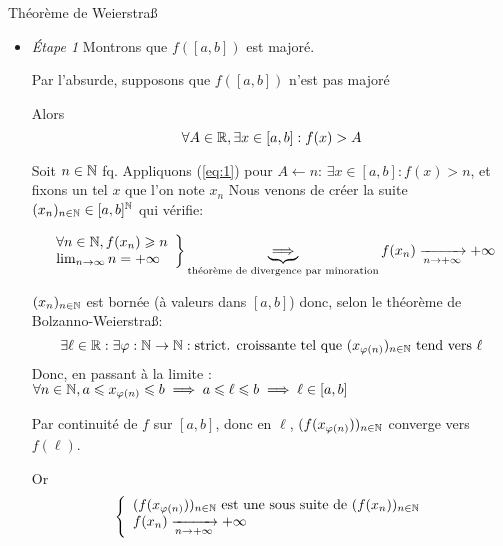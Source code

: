 \documentclass{article}
\renewenvironment{question_kholle}[2][ ]
{
	\subsection{\texorpdfstring{#2}{}}
	\notblank{#1}
	{
		\noindent #1
		\bigbreak
	}
	{}
	\begin{proof}
}
{
	\end{proof}
}
\begin{document}
\begin{question_kholle}
  [{L'image d'un segment par une fonction continue sur ce segment est un segment : soient $(a, b) \in \R^2$ tels que $a < b$ et $f: [a, b] \to \R$. Si $f \in \mathcal{C}^0([a, b], \R)$ alors $\exists (x_{1}, x_{2}) \in \R^2 : f([a, b]) = [f(x_{1}), f(x_{2})]$}]
  {Théorème de Weierstraß}
  \begin{itemize}

    \item \emph{Étape 1} Montrons que $f([a, b])$ est majoré.

          Par l'absurde, supposons que $f([a, b])$ n'est pas majoré

          Alors \begin{equation}\label{eq:1}
            \forall A \in \mathbb R, \exists x \in [a, b] : f(x) > A
          \end{equation}

          Soit $n \in \mathbb N$ fq.
          Appliquons (\ref{eq:1}) pour $A \leftarrow n$:
          $\exists x \in [a, b] : f(x) > n$, et fixons un tel $x$ que l'on note $x_{n}$
          Nous venons de créer la suite $(x_{n})_{n \in \mathbb N} \in [a, b]^{\mathbb N}$ qui vérifie:


          $$
            \left.
            \begin{array}{ll}
              \forall n \in \mathbb N, f(x_{n}) \geqslant n \\
              \lim_{ n \to \infty } n =  +\infty
            \end{array}
            \right\} \underbrace{ \implies }_{ \text{théorème de divergence par minoration} } f(x_{n}) \xrightarrow[n \to +\infty]{} + \infty
          $$


          $(x_{n})_{n \in \mathbb N}$ est bornée (à valeurs dans $[a, b]$) donc, selon le théorème de Bolzanno-Weierstraß:
          $$
            \exists \ell \in \mathbb R : \exists \varphi : \mathbb N \to \mathbb N : \text{strict. croissante tel que } (x_{\varphi(n)})_{n \in \mathbb N} \text{ tend vers } \ell
          $$
          Donc, en passant à la limite : $\forall n \in \mathbb N, a \leqslant x_{\varphi(n)} \leqslant b \implies a \leqslant \ell \leqslant b \implies \ell \in [a, b]$

          Par continuité de $f$ sur $[a, b]$, donc en $\ell$, $(f(x_{\varphi(n)}))_{n \in \mathbb N}$ converge vers $f(\ell)$.

          Or $$
            \left\{ \begin{array}{ll}
              (f(x_{\varphi(n)}))_{n \in \mathbb N} \text{ est une sous suite de } (f(x_{n}))_{n \in \mathbb N} \\
              f(x_{n}) \xrightarrow[n \to + \infty]{} + \infty
            \end{array}\right.$$


\end{itemize}
\end{question_kholle}
\end{document}

